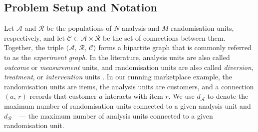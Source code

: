 \documentclass[sigconf]{acmart}
\begin{document}
\subsection{Problem Setup and Notation}\label{subsec:notation}

Let $\mathcal A$ and $\mathcal R$ be the populations of $N$ analysis and $M$ randomisation units, respectively, and let $\mathcal C\subset \mathcal A \times \mathcal R$ be the set of connections between them. Together, the triple $\langle \mathcal A,\,\mathcal R,\,\mathcal C\rangle$ forms a bipartite graph that is commonly referred to as the \emph{experiment graph}. In the literature, analysis units are also called \emph{outcome} or \emph{measurement} units, and randomisation units are also called \emph{diversion}, \emph{treatment}, or \emph{intervention} units \cite{zigler2021bipartite,harshaw2023erl,doudchenko2020causal,tan2025estimating}. In our running marketplace example, the randomisation units are items, the analysis units are customers, and a connection $(a,\,r)$ records that customer $a$ interacts with item $r$. We use $d_\mathcal{A}$ to denote the maximum number of randomisation units connected to a given analysis unit and $d_\mathcal{R}$~~---  the maximum number of analysis units connected to a given randomisation unit.
\end{document}
